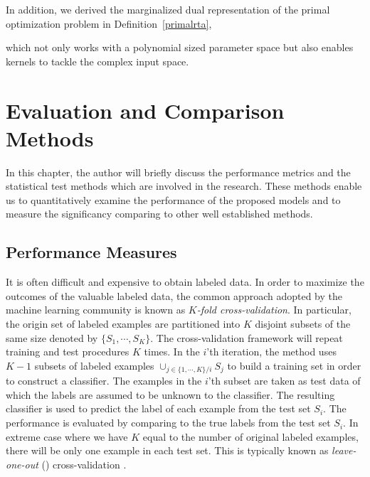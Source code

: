 {In addition, we derived the marginalized dual representation of the primal optimization problem in Definition~\ref{primalrta},

which not only works with a polynomial sized parameter space but also enables kernels to tackle the complex input space.



%
\iffalse
\chapter{Evaluation and Comparison Methods} \label{ch_ecm}

In this chapter, the author will briefly discuss the performance metrics and the statistical test methods which are involved in the research. 
These methods enable us to quantitatively examine the performance of the proposed models and to measure the significancy comparing to other well established methods.

%
\section{Performance Measures} \label{sc_pm}

It is often difficult and expensive to obtain labeled data. 
In order to maximize the outcomes of the valuable labeled data, the common approach adopted by the machine learning community is known as \textit{$K$-fold cross-validation}.
In particular, the origin set of labeled examples are partitioned into $K$ disjoint subsets of the same size denoted by $\{S_1,\cdots,S_K\}$.
The cross-validation framework will repeat training and test procedures $K$ times.
In the $i$'th iteration, the method uses $K-1$ subsets of labeled examples $\cup_{j\in\{1,\cdots,K\}/i}S_j$ to build a training set in order to construct a classifier.
The examples in the $i$'th subset are taken as test data of which the labels are assumed to be unknown to the classifier.
The resulting classifier is used to predict the label of each example from the test set $S_i$.
The performance is evaluated by comparing to the true labels from the test set $S_i$.
In extreme case where we have $K$ equal to the number of original labeled examples, there will be only one example in each test set.
This is typically known as \textit{leave-one-out} (\loo) {cross-validation} .

}
